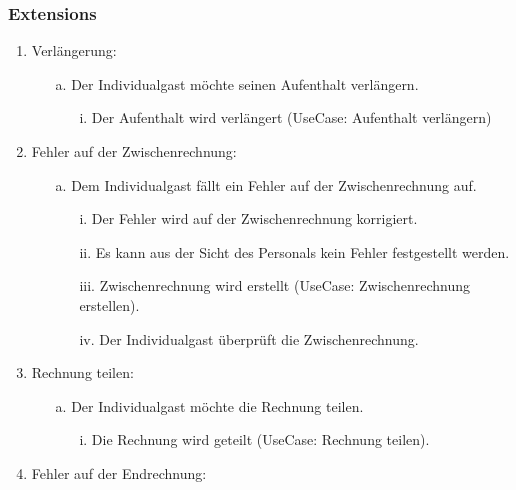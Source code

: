 \documentclass[./detailed_overview_usecases.tex]{subfiles}
\begin{document}
    \subsubsection*{Extensions}
    \begin{enumerate}
        \item Verlängerung:
                \begin{itemize}
                       \item[a.] Der Individualgast möchte seinen Aufenthalt verlängern.
                            \begin{itemize}
                                \item[i.] Der Aufenthalt wird verlängert (UseCase: Aufenthalt verlängern)
                            \end{itemize}
                \end{itemize}
        \setcounter{emuni}{2}
        \item Fehler auf der Zwischenrechnung:
            \begin{itemize}
                \item[a.] Dem Individualgast fällt ein Fehler auf der Zwischenrechnung auf.
                \begin{itemize}
                    \item[i.] Der Fehler wird auf der Zwischenrechnung korrigiert.
                    \item[ii.] Es kann aus der Sicht des Personals kein Fehler festgestellt werden.
                    \item[iii.] Zwischenrechnung wird erstellt (UseCase: Zwischenrechnung erstellen).
                    \item[iv.] Der Individualgast überprüft die Zwischenrechnung.
                \end{itemize}
            \end{itemize}
        \setcounter{emuni}{2}
        \item Rechnung teilen:
        \begin{itemize}
            \item[a.] Der Individualgast möchte die Rechnung teilen.
            \begin{itemize}
                \item[i.] Die Rechnung wird geteilt (UseCase: Rechnung teilen).
            \end{itemize}
        \end{itemize}
        \item Fehler auf der Endrechnung:

\end{enumerate}
\end{document}
